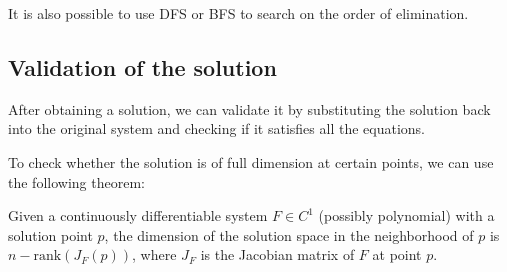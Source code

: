 It is also possible to use DFS or BFS to search on the order of elimination.

\subsection*{Validation of the solution}

After obtaining a solution, we can validate it by substituting the solution back into the original system and checking if it satisfies all the equations.

To check whether the solution is of full dimension at certain points, we can use the following theorem:
\begin{theorem}
  Given a continuously differentiable system $F\in C^1$ (possibly polynomial) with a solution point $p$, the dimension of the solution space in the neighborhood of $p$ is $n - \text{rank}(J_F(p))$, where $J_F$ is the Jacobian matrix of $F$ at point $p$.
\end{theorem}
